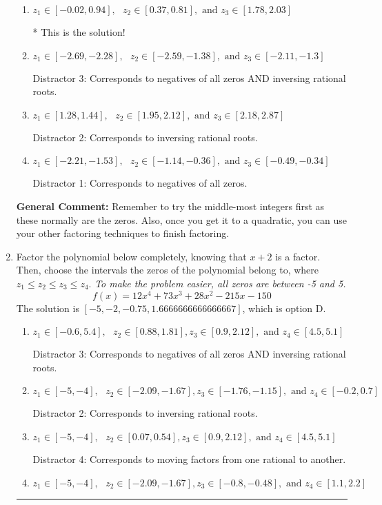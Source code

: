 \documentclass{extbook}[14pt]
\newcommand{\litem}[1]{\item #1

\rule{\textwidth}{0.4pt}}
\begin{document}
\begin{enumerate}
{\begin{enumerate}[label=\Alph*.]
 Distractor 4: Corresponds to moving factors from one rational to another.
\item \( z_1 \in [-0.02, 0.94], \text{   }  z_2 \in [0.37, 0.81], \text{   and   } z_3 \in [1.78, 2.03] \)

* This is the solution!
\item \( z_1 \in [-2.69, -2.28], \text{   }  z_2 \in [-2.59, -1.38], \text{   and   } z_3 \in [-2.11, -1.3] \)

 Distractor 3: Corresponds to negatives of all zeros AND inversing rational roots.
\item \( z_1 \in [1.28, 1.44], \text{   }  z_2 \in [1.95, 2.12], \text{   and   } z_3 \in [2.18, 2.87] \)

 Distractor 2: Corresponds to inversing rational roots.
\item \( z_1 \in [-2.21, -1.53], \text{   }  z_2 \in [-1.14, -0.36], \text{   and   } z_3 \in [-0.49, -0.34] \)

 Distractor 1: Corresponds to negatives of all zeros.
\end{enumerate}

\textbf{General Comment:} Remember to try the middle-most integers first as these normally are the zeros. Also, once you get it to a quadratic, you can use your other factoring techniques to finish factoring.
}
\litem{
Factor the polynomial below completely, knowing that $x+2$ is a factor. Then, choose the intervals the zeros of the polynomial belong to, where $z_1 \leq z_2 \leq z_3 \leq z_4$. \textit{To make the problem easier, all zeros are between -5 and 5.}
\[ f(x) = 12x^{4} +73 x^{3} +28 x^{2} -215 x -150 \]The solution is \( [-5, -2, -0.75, 1.6666666666666667] \), which is option D.\begin{enumerate}[label=\Alph*.]
\item \( z_1 \in [-0.6, 5.4], \text{   }  z_2 \in [0.88, 1.81], z_3 \in [0.9, 2.12], \text{   and   } z_4 \in [4.5, 5.1] \)

 Distractor 3: Corresponds to negatives of all zeros AND inversing rational roots.
\item \( z_1 \in [-5, -4], \text{   }  z_2 \in [-2.09, -1.67], z_3 \in [-1.76, -1.15], \text{   and   } z_4 \in [-0.2, 0.7] \)

 Distractor 2: Corresponds to inversing rational roots.
\item \( z_1 \in [-5, -4], \text{   }  z_2 \in [0.07, 0.54], z_3 \in [0.9, 2.12], \text{   and   } z_4 \in [4.5, 5.1] \)

 Distractor 4: Corresponds to moving factors from one rational to another.
\item \( z_1 \in [-5, -4], \text{   }  z_2 \in [-2.09, -1.67], z_3 \in [-0.8, -0.48], \text{   and   } z_4 \in [1.1, 2.2] \)


\end{enumerate}}
\end{enumerate}
\end{document}
